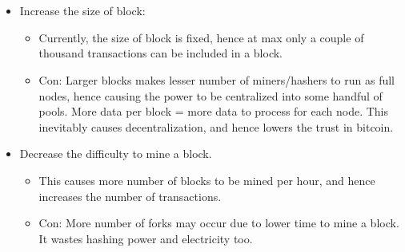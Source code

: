 \section{}
\begin{itemize}
		\item Increase the size of block: 
	\begin{itemize}
			\item Currently, the size of block is fixed, hence at max only a couple of thousand transactions can be included in a block. 
			\item Con: Larger blocks makes lesser number of miners/hashers to run as full nodes, hence causing the power to be centralized into some handful of pools. More data per block = more data to process for each node. This inevitably causes decentralization, and hence lowers the trust in bitcoin.
	\end{itemize}
		\item Decrease the difficulty to mine a block. 
	\begin{itemize}
			\item This causes more number of blocks to be mined per hour, and hence increases the number of transactions.
			\item Con: More number of forks may occur due to lower time to mine a block. It wastes hashing power and electricity too.
	\end{itemize}
\end{itemize}

